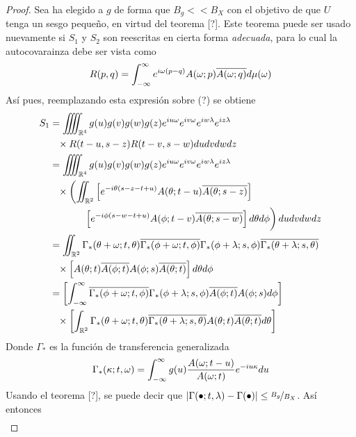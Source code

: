 \begin{proof}
Sea ha elegido a $g$ de forma que $B_g << B_X$ con el objetivo de que $U$ tenga un sesgo pequeño, en virtud del teorema [?]. Este teorema puede ser usado nuevamente si $S_1$ y $S_2$ son reescritas en cierta forma \textit{adecuada}, para lo cual la autocovarainza debe ser vista como
\begin{equation}
R(p,q) = \int_{-\infty}^{\infty} e^{i \omega (p-q)} A(\omega; p)\overline{A(\omega; q)} d\mu(\omega) 
\end{equation}
Así pues, reemplazando esta expresión sobre (?) se obtiene
\begin{align*}
S_1 &=
\iiiint_{\R^{4}} g(u) g(v) g(w) g(z) e^{i u \omega} e^{i v \omega} e^{i w \lambda} e^{i z \lambda} \\
&\pheq \times R(t-u,s-z)R(t-v,s-w) du dv dw dz \\
&= 
\iiiint_{\R^{4}} g(u) g(v) g(w) g(z) e^{i u \omega} e^{i v \omega} e^{i w \lambda} e^{i z \lambda} \\
&\pheq \times \left( 
\iint_{\R^{2}} 
\left[ 
e^{-i \theta (s-z-t+u)} A(\theta; t-u) \overline{A(\theta; s-z)} 
\right] 
\right. \\
&\pheq 
\left. \vphantom{\int} \phantom{times}
\left[ e^{-i \phi (s-w-t+u)} A(\phi; t-v) \overline{A(\theta; s-w)} \right] d\theta d\phi
\right) du dv dw dz
\\
 &= \iint_{\R^{2}} \Gamma_*(\theta+ \omega; t, \theta) \overline{\Gamma_*(\phi + \omega; t, \phi)}
 \Gamma_*(\phi+ \lambda; s, \phi) \overline{\Gamma_*(\theta + \lambda; s, \theta)} \\
 &\pheq \times
 \left[
 A(\theta; t) \overline{A(\phi; t)} A(\phi; s) \overline{A(\theta; t)}
 \right] d\theta d\phi
\\
 &= \left[ \intR \overline{\Gamma_*(\phi + \omega; t, \phi)} \Gamma_*(\phi+ \lambda; s, \phi)
 \overline{A(\phi; t)} A(\phi; s) d\phi \right] \\
 &\pheq \times \left[ \int_{\R^{2}} \Gamma_*(\theta+ \omega; t, \theta) 
  \overline{\Gamma_*(\theta + \lambda; s, \theta)}  
 A(\theta; t)   \overline{A(\theta; t)} d\theta \right] 
\end{align*}
Donde $\Gamma_*$ es la función de transferencia generalizada
\begin{equation}
\Gamma_*(\kappa; t, \omega) = \int_{-\infty}^{\infty} g(u) \frac{A(\omega; t-u)}{A(\omega; t)} e^{-i u \kappa} du
\end{equation}
Usando el teorema [?], se puede decir que $\left| \Gamma(\bullet; t, \lambda) - \Gamma(\bullet) \right| \leq \nicefrac{B_g}{B_X}$. Así entonces
\begin{align*}

\end{align*}
\end{proof}
